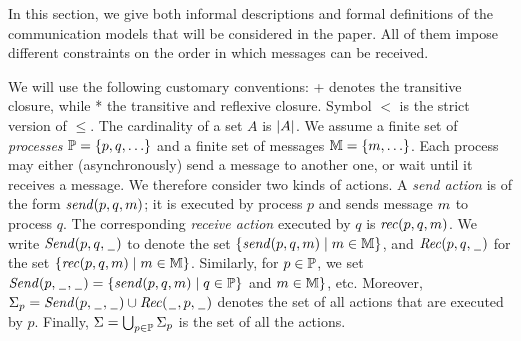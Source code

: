 
In this section, we give both informal descriptions and formal definitions of the communication models that will be considered in the paper. All of them impose different constraints on the order in which messages can be received.

%

We will use the following customary conventions:  + denotes the transitive closure, while * the transitive and reflexive closure. Symbol $<$ is the strict version of $\leq$.  The cardinality of a set $A$ is  $| A |$.
%
We assume a finite set of \emph{processes} $\mathbb{P}=\{p,q,\ldots\}$ and a finite set of messages $\mathbb{M}=\{m,\ldots\}$.
Each process may either (asynchronously) send a message to another one, or wait until it receives a message.
We therefore consider two kinds of actions. A \emph{send action} is of the form $\mathit{send}(p, q, m)$;
it is executed by process $p$ and sends message $m$ to process $q$.
The corresponding \emph{receive action} executed by $q$ is $\mathit{rec}(p, q, m)$.
%
We write ${\mathit{Send}(p,q,\hspace{0.1em}\underline{\hspace{0.5em}}\hspace{0.1em})}$ to denote the set $\{\mathit{send}(p, q, m) \mid m \in \mathbb{M}\}$, and
${\mathit{Rec}(p,q,\hspace{0.1em}\underline{\hspace{0.5em}}\hspace{0.1em})}$ for the set $\{\mathit{rec}(p, q, m) \mid m \in \mathbb{M}\}$.
Similarly, for $p \in \mathbb{P}$, we set
${\mathit{Send}(p,\hspace{0.1em}\underline{\hspace{0.5em}}\hspace{0.1em},\hspace{0.1em}\underline{\hspace{0.5em}}\hspace{0.1em})} = \{\mathit{send}(p, q, m) \mid q \in \mathbb{P}
\}$ and $m \in \mathbb{M}\}$, etc.
Moreover, $\Sigma_{p} = {\mathit{Send}(p,\hspace{0.1em}\underline{\hspace{0.5em}}\hspace{0.1em},\hspace{0.1em}\underline{\hspace{0.5em}}\hspace{0.1em})} \cup {\mathit{Rec}(\hspace{0.1em}\underline{\hspace{0.5em}}\hspace{0.1em},p,\hspace{0.1em}\underline{\hspace{0.5em}}\hspace{0.1em})}$ denotes the set of all actions that are
executed by $p$.
Finally, $\Sigma = \bigcup_{p \in \mathbb{P}} \Sigma_{p}$
is the set of all the actions.


